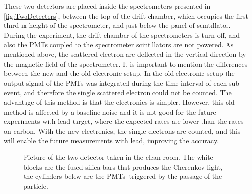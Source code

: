 These two detectors are placed inside the spectrometers presented in \ref{fig:TwoDetectors}, between the top of the drift-chamber, which occupies the first third in height of the spectrometer, and just below the panel of scintillator. During the experiment, the drift chamber of the spectrometers is turn off, and also the PMTs coupled to the spectrometer scintillators are not powered.
As mentioned above, the scattered electron are deflected in the vertical direction by the magnetic field of the spectrometer. It is important to mention the differences between the new and the old electronic setup. In the old electronic setup the output signal of the PMTs was integrated during the time interval of each sub-event, and therefore the single scattered electron could not be counted. The advantage of this method is that the electronics is simpler. However, this old method is affected by a baseline noise and it is not good for the future experiments with lead target, where the expected rates are lower than the rates on carbon.
With the new electronics, the single electrons are counted, and this will enable the future measurements with lead, improving the accuracy. 

\begin{figure}[hbtp]
\centering
{} \quad
{} \quad
	\label{fig:Detectors}
\caption{Picture of the two detector taken in the clean room. The white blocks are the fused silica bars that produces the Cherenkov light, the cylinders below are the PMTs, triggered by the passage of the particle. }
\end{figure}

